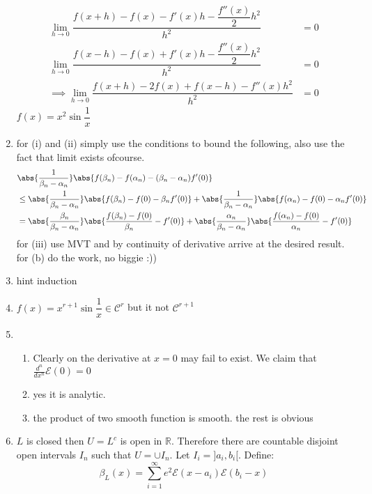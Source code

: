 \begin{enumerate}
          \begin{align}
              \lim_{h \to 0}{\dfrac{f(x+h) - f(x) - f'(x)h - \dfrac{f''(x)}{2} h^2}{h^2}} & = 0
              \\
              \lim_{h \to 0}{\dfrac{f(x-h) - f(x) + f'(x)h - \dfrac{f''(x)}{2} h^2}{h^2}} & = 0
              \\
              \implies \lim_{h \to 0}{\dfrac{f(x+h)  -2 f(x) + f(x-h) - f''(x) h^2}{h^2}} & = 0
          \end{align}
          \(f(x) = x^2\sin{\dfrac{1}{x}}\)
    \item for (i) and (ii) simply use the conditions to bound the following, also use the fact that limit exists ofcourse.
          \begin{align}
               & \abs{\dfrac{1}{\beta_n - \alpha_n}}\abs{f(\beta_n) - f(\alpha_n) - (\beta_n - \alpha_n)f'(0)}                                                                                               \\
               & \leq \abs{\dfrac{1}{\beta_n - \alpha_n}}\abs{f(\beta_n) - f(0) - \beta_n f'(0)} + \abs{\dfrac{1}{\beta_n - \alpha_n}}\abs{ f(\alpha_n) - f(0) - \alpha_n f'(0)}                             \\
               & = \abs{\dfrac{\beta_n}{\beta_n - \alpha_n}}\abs{\dfrac{f(\beta_n) - f(0)}{\beta_n} - f'(0)} + \abs{\dfrac{\alpha_n}{\beta_n - \alpha_n}}\abs{ \dfrac{f(\alpha_n) - f(0)}{\alpha_n} - f'(0)}
          \end{align}
          for (iii) use MVT and by continuity of derivative arrive at the desired result. for (b) do the work, no biggie :))
    \item hint induction
    \item \(f(x) = x^{r+1}\sin{\dfrac{1}{x}} \in \mathcal{C}^r\) but it not \(\mathcal{C}^{r+1}\)
    \item \leavevmode
          \begin{enumerate}
              \item Clearly on the derivative at \(x = 0\) may fail to exist. We claim that \(\frac{d^n}{dx^n}\mathcal{E}(0) = 0\)
              \item yes it is analytic.
              \item the product of two smooth function is smooth. the rest is obvious
          \end{enumerate}
    \item \(L\) is closed then \(U = L^c\) is open in \(\mathbb{R}\). Therefore there are countable disjoint open intervals \(I_n\) such that \(U = \cup I_n\). Let \(I_i = ]a_i,b_i[\). Define:
          \begin{equation}
              \beta_L(x) = \sum_{i = 1}^{\infty}{e^2 \mathcal{E}(x -a_i) \mathcal{E}(b_i - x)}
          \end{equation}
\end{enumerate}
